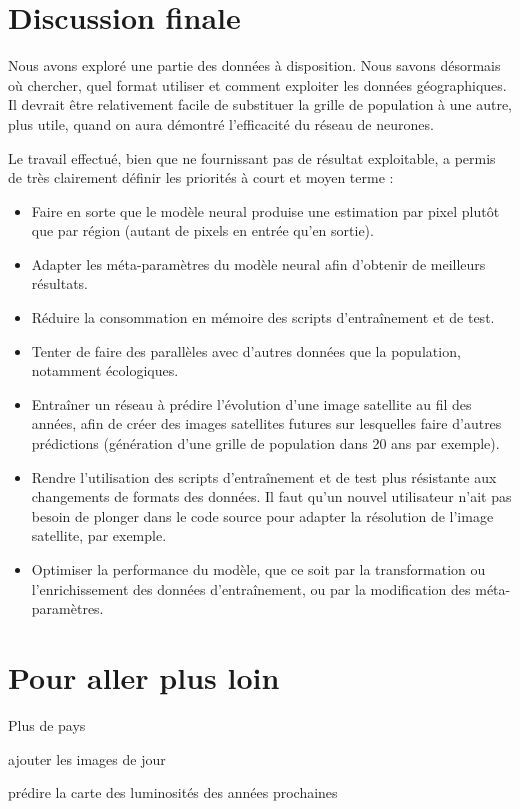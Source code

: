 \documentclass[a4paper, 11pt]{report}
\begin{document}
\section{Discussion finale}
Nous avons exploré une partie des données à disposition. Nous savons désormais où chercher, quel format utiliser et comment exploiter les données géographiques. Il devrait être relativement facile de substituer la grille de population à une autre, plus utile, quand on aura démontré l'efficacité du réseau de neurones.

Le travail effectué, bien que ne fournissant pas de résultat exploitable, a permis de très clairement définir les priorités à court et moyen terme :
\begin{itemize}
	\item Faire en sorte que le modèle neural produise une estimation par pixel plutôt que par région (autant de pixels en entrée qu'en sortie).
	\item Adapter les méta-paramètres du modèle neural afin d'obtenir de meilleurs résultats.
	\item Réduire la consommation en mémoire des scripts d'entraînement et de test.
	\item Tenter de faire des parallèles avec d'autres données que la population, notamment écologiques.
	\item Entraîner un réseau à prédire l'évolution d'une image satellite au fil des années, afin de créer des images satellites futures sur lesquelles faire d'autres prédictions (génération d'une grille de population dans 20 ans par exemple).
	\item Rendre l'utilisation des scripts d'entraînement et de test plus résistante aux changements de formats des données. Il faut qu'un nouvel utilisateur n'ait pas besoin de plonger dans le code source pour adapter la résolution de l'image satellite, par exemple.
	\item Optimiser la performance du modèle, que ce soit par la transformation ou l'enrichissement des données d'entraînement, ou par la modification des méta-paramètres.
\end{itemize}

\section{Pour aller plus loin}

Plus de pays

ajouter les images de jour

prédire la carte des luminosités des années prochaines
\end{document}
